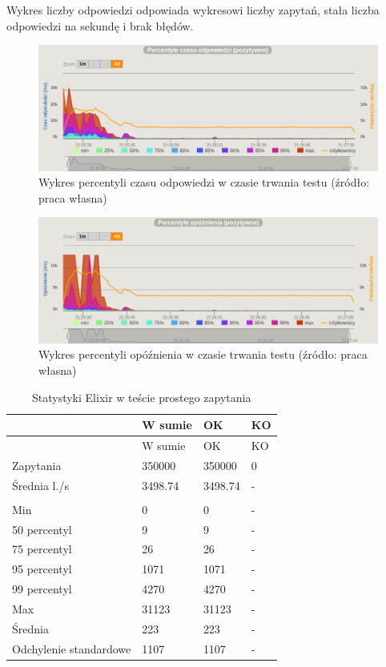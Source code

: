\documentclass[12pt,twoside]{article}
\begin{document}
Wykres liczby odpowiedzi odpowiada wykresowi liczby zapytań, stała
liczba odpowiedzi na sekundę i brak błędów.

\begin{figure}[htbp]
\centering
\includegraphics[resolution=150]{test_results/elixir/simpletest/screenshots/response_percentile.png}
\caption{Wykres percentyli czasu odpowiedzi w czasie trwania testu (źródło: praca własna)}
\label{elixir:simple:response_percentile}
\end{figure}

\begin{figure}[htbp]
\centering
\includegraphics[resolution=150]{test_results/elixir/simpletest/screenshots/latency_percentile.png}
\caption{Wykres percentyli opóźnienia w czasie trwania testu (źródło: praca własna)}
\label{elixir:simple:latency_percentile}
\end{figure}

\begin{longtable}[c]{@{}llll@{}}
\caption{Statystyki Elixir w teście prostego zapytania}\tabularnewline
\toprule
& W sumie & OK & KO\tabularnewline
\midrule
\endfirsthead
\toprule
& W sumie & OK & KO\tabularnewline
\midrule
\endhead
Zapytania & 350000 & 350000 & 0\tabularnewline
Średnia l./s & 3498.74 & 3498.74 & -\tabularnewline
& & &\tabularnewline
Min & 0 & 0 & -\tabularnewline
50 percentyl & 9 & 9 & -\tabularnewline
75 percentyl & 26 & 26 & -\tabularnewline
95 percentyl & 1071 & 1071 & -\tabularnewline
99 percentyl & 4270 & 4270 & -\tabularnewline
Max & 31123 & 31123 & -\tabularnewline
Średnia & 223 & 223 & -\tabularnewline
Odchylenie standardowe & 1107 & 1107 & -\tabularnewline
\bottomrule
\end{longtable}
\end{document}
